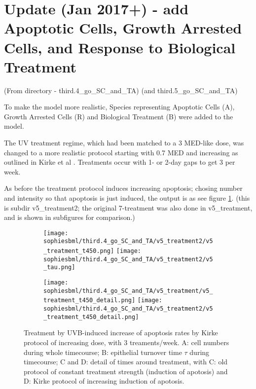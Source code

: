 \documentclass[a4paper,10pt]{report}
\newcommand{\psortbase}{/home/ngrs2/work/bsu/PSORT_Zuliani_Reynolds/}
\newcommand{\sbmlbase}{\psortbase/sbml-sh/}
\newcommand{\sophiesbml}{\sbmlbase/sophie_like}
\begin{document}
\section{Update (Jan 2017+) - add Apoptotic Cells, Growth Arrested Cells, and Response to Biological Treatment} \label{sec:SWjan17}

(From directory  - third.4\_go\_SC\_and\_TA) 
(and  third.5\_go\_SC\_and\_TA) 

To make the model more realistic, Species representing Apoptotic Cells (A), Growth Arrested Cells (R) and Biological Treatment (B) were added to the model. 

The UV treatment regime, which had been matched to a 3 MED-like dose, was changed to a more realistic protocol starting with 0.7 MED and increasing
as outlined in Kirke et al \cite{kirke2007randomized}. Treatments occur with 1- or 2-day gaps to get 3 per week. 

As before the treatment protocol induces 
increasing apoptosis; chosing number and intensity 
so that apoptosis is just induced, the output is as  see figure \ref{fig:thirdpoint4sophie_treatment}. (this is subdir v5\_treatment2; the original 7-treatment was also done in v5\_treatment, and is shown in subfigures for comparison.)

\begin{figure}[h!]
  \begin{subfigure}{\textwidth}
    \subcaptionbox{}
    {\texttt{[image: \\sophiesbml/third.4\_go\_SC\_and\_TA/v5\_treatment2/v5\_treatment\_t450.png]}}
    \subcaptionbox{}
    {\texttt{[image: \\sophiesbml/third.4\_go\_SC\_and\_TA/v5\_treatment2/v5\_tau.png]}}
  \end{subfigure}
  \begin{subfigure}{\textwidth}
    \subcaptionbox{}
    {\texttt{[image: \\sophiesbml/third.4\_go\_SC\_and\_TA/v5\_treatment/v5\_treatment\_t450\_detail.png]}}
    \subcaptionbox{}
    {\texttt{[image: \\sophiesbml/third.4\_go\_SC\_and\_TA/v5\_treatment2/v5\_treatment\_t450\_detail.png]}}
  \end{subfigure}
  \caption{Treatment by UVB-induced increase of apoptosis rates by Kirke protocol of increasing dose, with 3 treaments/week. A: cell numbers during whole timecourse; B: epithelial turnover time $\tau$ during timecourse; C and D: detail of times around treatment, with C: old protocol of constant treatment strength (induction of apotosis) and D: Kirke protocol of increasing induction of apotosis.}
  \label{fig:thirdpoint4sophie_treatment}
\end{figure}
\end{document}
